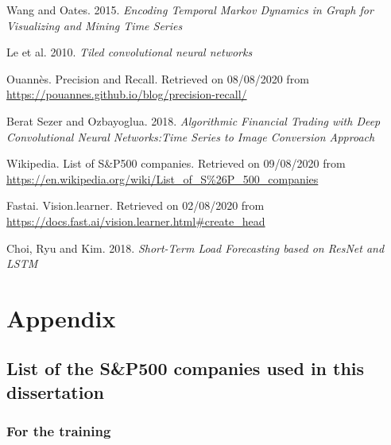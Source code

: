 \documentclass[11pt]{article}
\begin{document}
\begin{onehalfspace}
\begin{thebibliography}{9}
    Wang and Oates. 2015. \textit{Encoding Temporal Markov Dynamics in Graph for Visualizing and Mining Time Series}

    Le et al. 2010. \textit{Tiled convolutional neural networks}

    Ouannès. Precision and Recall. Retrieved on 08/08/2020 from \url{https://pouannes.github.io/blog/precision-recall/}

    Berat Sezer and Ozbayoglua. 2018. \textit{Algorithmic Financial Trading with Deep Convolutional Neural Networks:Time Series to Image Conversion Approach}

    Wikipedia. List of S\&P500 companies. Retrieved on 09/08/2020 from \url{https://en.wikipedia.org/wiki/List_of_S%26P_500_companies}

    Fastai. Vision.learner. Retrieved on 02/08/2020 from \url{https://docs.fast.ai/vision.learner.html#create_head}

    Choi, Ryu and Kim. 2018. \textit{Short-Term Load Forecasting based on
    ResNet and LSTM}

\end{thebibliography}

\pagebreak

\section{Appendix}

\subsection{List of the S\&P500 companies used in this dissertation}
\label{505}

\subsubsection{For the training}


\end{onehalfspace}
\end{document}
